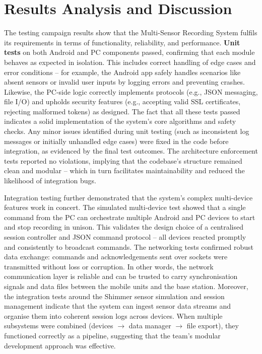 \section{Results Analysis and Discussion}
The testing campaign results show that the Multi-Sensor Recording System fulfils its requirements in terms of functionality, reliability, and performance. \textbf{Unit tests} on both Android and PC components passed, confirming that each module behaves as expected in isolation. This includes correct handling of edge cases and error conditions -- for example, the Android app safely handles scenarios like absent sensors or invalid user inputs by logging errors and preventing crashes. Likewise, the PC-side logic correctly implements protocols (e.g., JSON messaging, file I/O) and upholds security features (e.g., accepting valid SSL certificates, rejecting malformed tokens) as designed. The fact that all these tests passed indicates a solid implementation of the system's core algorithms and safety checks. Any minor issues identified during unit testing (such as inconsistent log messages or initially unhandled edge cases) were fixed in the code before integration, as evidenced by the final test outcomes. The architecture enforcement tests reported no violations, implying that the codebase's structure remained clean and modular -- which in turn facilitates maintainability and reduced the likelihood of integration bugs.

Integration testing further demonstrated that the system's complex multi-device features work in concert. The simulated multi-device test showed that a single command from the PC can orchestrate multiple Android and PC devices to start and stop recording in unison. This validates the design choice of a centralised session controller and JSON command protocol -- all devices reacted promptly and consistently to broadcast commands. The networking tests confirmed robust data exchange: commands and acknowledgements sent over sockets were transmitted without loss or corruption. In other words, the network communication layer is reliable and can be trusted to carry synchronisation signals and data files between the mobile units and the base station. Moreover, the integration tests around the Shimmer sensor simulation and session management indicate that the system can ingest sensor data streams and organise them into coherent session logs across devices. When multiple subsystems were combined (devices $\rightarrow$ data manager $\rightarrow$ file export), they functioned correctly as a pipeline, suggesting that the team's modular development approach was effective.

